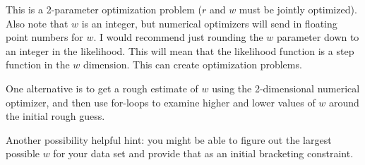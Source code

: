 \documentclass[11pt]{article}
\begin{document}
This is a 2-parameter optimization problem ($r$ and $w$ must
    be jointly optimized).
Also note that $w$ is an integer, but numerical optimizers 
    will send in floating point numbers for $w$.
I would recommend just rounding the $w$ parameter 
    down to an integer in the likelihood.
This will mean that the likelihood function is a step function
    in the $w$ dimension.
This can create optimization problems.

One alternative is to get a rough estimate of $w$ using the 2-dimensional
    numerical optimizer, and then use for-loops to examine
    higher and lower values of $w$ around the initial
    rough guess.

Another possibility helpful hint: you might be able
    to figure out the largest possible $w$ for your data
    set and provide that as an initial bracketing constraint.
\end{document}
